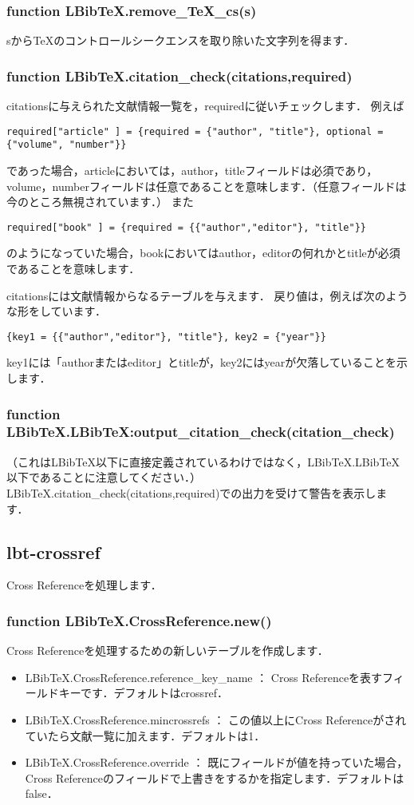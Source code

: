 \documentclass[dvipdfmx,a4paper]{jsarticle}
\begin{document}
\subsubsection{function LBibTeX.remove\_TeX\_cs(s)}
sから\TeX のコントロールシークエンスを取り除いた文字列を得ます．

\subsubsection{function LBibTeX.citation\_check(citations,required)}
citationsに与えられた文献情報一覧を，requiredに従いチェックします．
例えば
\begin{lstlisting}
required["article" ] = {required = {"author", "title"}, optional = {"volume", "number"}}
\end{lstlisting}
であった場合，articleにおいては，author，titleフィールドは必須であり，volume，numberフィールドは任意であることを意味します．（任意フィールドは今のところ無視されています．）
また
\begin{lstlisting}
required["book" ] = {required = {{"author","editor"}, "title"}}
\end{lstlisting}
のようになっていた場合，bookにおいてはauthor，editorの何れかとtitleが必須であることを意味します．

citationsには文献情報からなるテーブルを与えます．
戻り値は，例えば次のような形をしています．
\begin{lstlisting}
{key1 = {{"author","editor"}, "title"}, key2 = {"year"}}
\end{lstlisting}
key1には「authorまたはeditor」とtitleが，key2にはyearが欠落していることを示します．

\subsubsection{function LBibTeX.LBibTeX:output\_citation\_check(citation\_check)}
（これはLBibTeX以下に直接定義されているわけではなく，LBibTeX.LBibTeX以下であることに注意してください．）
LBibTeX.citation\_check(citations,required)での出力を受けて警告を表示します．

\subsection{lbt-crossref}
Cross Referenceを処理します．

\subsubsection{function LBibTeX.CrossReference.new()}
Cross Referenceを処理するための新しいテーブルを作成します．
\begin{itemize}
\item LBibTeX.CrossReference.reference\_key\_name ： Cross Referenceを表すフィールドキーです．デフォルトはcrossref．
\item LBibTeX.CrossReference.mincrossrefs ： この値以上にCross Referenceがされていたら文献一覧に加えます．デフォルトは1．
\item LBibTeX.CrossReference.override ： 既にフィールドが値を持っていた場合，Cross Referenceのフィールドで上書きをするかを指定します．デフォルトはfalse．
\end{itemize}
\end{document}
